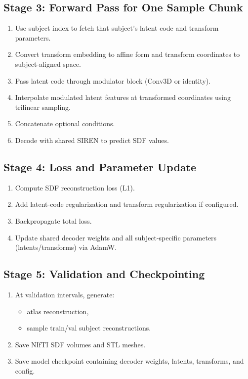 ﻿\documentclass[11pt]{article}
\begin{document}
\subsection{Stage 3: Forward Pass for One Sample Chunk}
\begin{enumerate}[leftmargin=*]
    \item Use subject index to fetch that subject's latent code and transform parameters.
    \item Convert transform embedding to affine form and transform coordinates to subject-aligned space.
    \item Pass latent code through modulator block (Conv3D or identity).
    \item Interpolate modulated latent features at transformed coordinates using trilinear sampling.
    \item Concatenate optional conditions.
    \item Decode with shared SIREN to predict SDF values.
\end{enumerate}

\subsection{Stage 4: Loss and Parameter Update}
\begin{enumerate}[leftmargin=*]
    \item Compute SDF reconstruction loss (L1).
    \item Add latent-code regularization and transform regularization if configured.
    \item Backpropagate total loss.
    \item Update shared decoder weights and all subject-specific parameters (latents/transforms) via AdamW.
\end{enumerate}

\subsection{Stage 5: Validation and Checkpointing}
\begin{enumerate}[leftmargin=*]
    \item At validation intervals, generate:
    \begin{itemize}[leftmargin=*]
        \item atlas reconstruction,
        \item sample train/val subject reconstructions.
    \end{itemize}
    \item Save NIfTI SDF volumes and STL meshes.
    \item Save model checkpoint containing decoder weights, latents, transforms, and config.
\end{enumerate}
\end{document}
